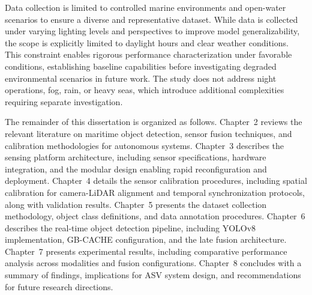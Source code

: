 \documentclass[../main.tex]{subfiles}
\begin{document}
Data collection is limited to controlled marine environments and open-water scenarios to ensure a diverse and representative dataset.
While data is collected under varying lighting levels and perspectives to improve model generalizability, the scope is explicitly limited to daylight hours and clear weather conditions.
This constraint enables rigorous performance characterization under favorable conditions, establishing baseline capabilities before investigating degraded environmental scenarios in future work.
The study does not address night operations, fog, rain, or heavy seas, which introduce additional complexities requiring separate investigation.

The remainder of this dissertation is organized as follows.
Chapter~2 reviews the relevant literature on maritime object detection, sensor fusion techniques, and calibration methodologies for autonomous systems.
Chapter~3 describes the sensing platform architecture, including sensor specifications, hardware integration, and the modular design enabling rapid reconfiguration and deployment.
Chapter~4 details the sensor calibration procedures, including spatial calibration for camera-\ac{LiDAR} alignment and temporal synchronization protocols, along with validation results.
Chapter~5 presents the dataset collection methodology, object class definitions, and data annotation procedures.
Chapter~6 describes the real-time object detection pipeline, including YOLOv8 implementation, GB-CACHE configuration, and the late fusion architecture.
Chapter~7 presents experimental results, including comparative performance analysis across modalities and fusion configurations.
Chapter~8 concludes with a summary of findings, implications for \ac{ASV} system design, and recommendations for future research directions.
\end{document}
